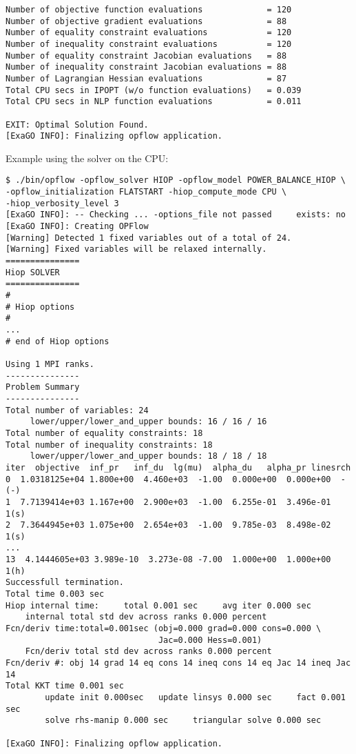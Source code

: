 \begin{lstlisting}
Number of objective function evaluations             = 120
Number of objective gradient evaluations             = 88
Number of equality constraint evaluations            = 120
Number of inequality constraint evaluations          = 120
Number of equality constraint Jacobian evaluations   = 88
Number of inequality constraint Jacobian evaluations = 88
Number of Lagrangian Hessian evaluations             = 87
Total CPU secs in IPOPT (w/o function evaluations)   = 0.039
Total CPU secs in NLP function evaluations           = 0.011

EXIT: Optimal Solution Found.
[ExaGO INFO]: Finalizing opflow application.
\end{lstlisting}

Example using the \hiop solver on the CPU:

\begin{lstlisting}
$ ./bin/opflow -opflow_solver HIOP -opflow_model POWER_BALANCE_HIOP \
-opflow_initialization FLATSTART -hiop_compute_mode CPU \
-hiop_verbosity_level 3
[ExaGO INFO]: -- Checking ... -options_file not passed     exists: no
[ExaGO INFO]: Creating OPFlow
[Warning] Detected 1 fixed variables out of a total of 24.
[Warning] Fixed variables will be relaxed internally.
===============
Hiop SOLVER
===============
#
# Hiop options
#
...
# end of Hiop options

Using 1 MPI ranks.
---------------
Problem Summary
---------------
Total number of variables: 24
     lower/upper/lower_and_upper bounds: 16 / 16 / 16
Total number of equality constraints: 18
Total number of inequality constraints: 18
     lower/upper/lower_and_upper bounds: 18 / 18 / 18
iter  objective  inf_pr   inf_du  lg(mu)  alpha_du   alpha_pr linesrch
0  1.0318125e+04 1.800e+00  4.460e+03  -1.00  0.000e+00  0.000e+00  -(-)
1  7.7139414e+03 1.167e+00  2.900e+03  -1.00  6.255e-01  3.496e-01  1(s)
2  7.3644945e+03 1.075e+00  2.654e+03  -1.00  9.785e-03  8.498e-02  1(s)
...
13  4.1444605e+03 3.989e-10  3.273e-08 -7.00  1.000e+00  1.000e+00  1(h)
Successfull termination.
Total time 0.003 sec
Hiop internal time:     total 0.001 sec     avg iter 0.000 sec
    internal total std dev across ranks 0.000 percent
Fcn/deriv time:total=0.001sec (obj=0.000 grad=0.000 cons=0.000 \
                               Jac=0.000 Hess=0.001)
    Fcn/deriv total std dev across ranks 0.000 percent
Fcn/deriv #: obj 14 grad 14 eq cons 14 ineq cons 14 eq Jac 14 ineq Jac 14
Total KKT time 0.001 sec
        update init 0.000sec   update linsys 0.000 sec     fact 0.001 sec
        solve rhs-manip 0.000 sec     triangular solve 0.000 sec

[ExaGO INFO]: Finalizing opflow application.
\end{lstlisting}


